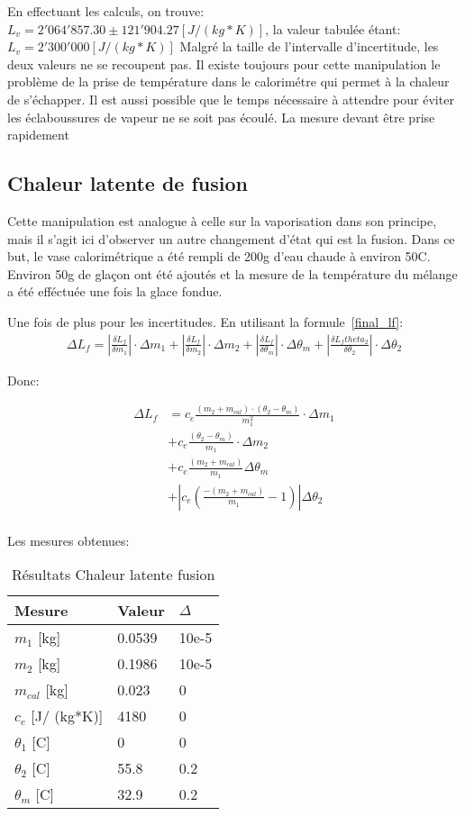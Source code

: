 En effectuant les calculs, on trouve: $L_v = 2'064'857.30\pm 121'904.27[J/ (kg*K)]$,
la valeur tabulée étant: $L_v = 2'300'000[J/ (kg*K)]$
Malgré la taille de l'intervalle d'incertitude, les deux valeurs ne se recoupent pas. Il existe toujours pour cette manipulation le problème de la prise de température dans le calorimétre qui permet à la chaleur de s'échapper. Il est aussi possible que le temps nécessaire à attendre pour éviter les éclaboussures de vapeur ne se soit pas écoulé. La mesure devant être prise rapidement 

\subsection{Chaleur latente de fusion}
Cette manipulation est analogue à celle sur la vaporisation dans son principe, mais il s'agit ici d'observer un autre changement d'état qui est la fusion.
Dans ce but, le vase calorimétrique a été rempli de 200g d'eau chaude à environ 50C\degree. Environ 50g de glaçon ont été ajoutés et la mesure de la température du mélange a été efféctuée une fois la glace fondue.

Une fois de plus pour les incertitudes.
En utilisant la formule~\eqref{final_lf}:
\begin{align*}
    \Delta L_f = |\frac{\delta L_f}{\delta m_1}|\cdot \Delta m_1 + |\frac{\delta L_f}{\delta m_2}|\cdot \Delta m_2 + |\frac{\delta L_f}{\delta \theta_m}|\cdot \Delta \theta_m + |\frac{\delta L_ftheta_2}{\delta \theta_2}|\cdot \Delta \theta_2
\end{align*}

Donc:

\begin{align*}
    \Delta L_f &= c_e \frac{(m_2 + m_{cal})\cdot (\theta_2 - \theta_m)}{m_1^2}\cdot \Delta m_1\\
    &+ c_e \frac{(\theta_2 - \theta_m)}{m_1}\cdot \Delta m_2\\
    &+ c_e \frac{(m_2 + m_{cal})}{m_1} \Delta \theta_m\\
    &+ |c_e (\frac{-(m_2 + m_{cal})}{m_1} -1)|\Delta \theta_2\\
\end{align*}

Les mesures obtenues:

\begin{table}[!h]
    \centering
    \caption{Résultats Chaleur latente fusion}
    \begin{tabular}{|l|l|l|}
	\hline
	Mesure	&Valeur	&$\Delta$\\
	\hline
	$m_1$ [kg]	&0.0539	&10e-5\\
	$m_2$ [kg]	&0.1986	&10e-5\\
	$m_{cal}$ [kg]	&0.023	&0\\
	$c_e$ [J/ (kg*K)]	&4180	&0\\
	$\theta_1$ [C\degree]	&0	&0\\
	$\theta_2$ [C\degree]	&55.8	&0.2\\
	$\theta_m$ [C\degree]	&32.9	&0.2\\
	\hline
    \end{tabular}
\end{table}

